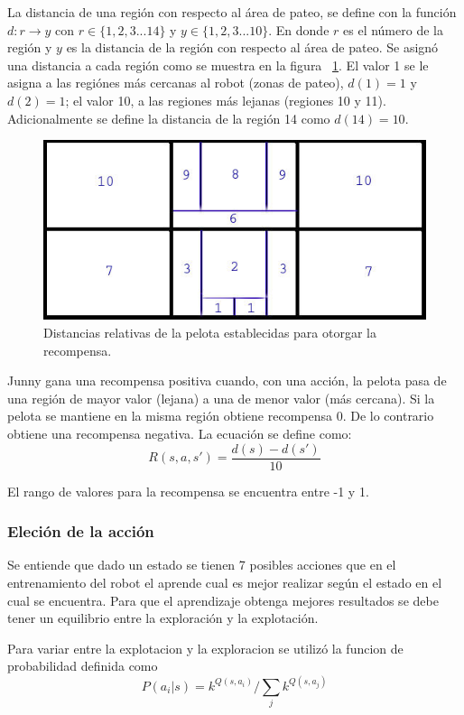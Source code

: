 La distancia de una región con respecto al área de pateo, se define con la función $d: r \rightarrow y$ con $r \in \{1,2,3 ...14\}$ y $y \in \{1,2,3 ...10\}$. En donde $r$ es el número de la región y $y$ es la distancia de la región con respecto al \'area de pateo. Se asign\'o una distancia a cada regi\'on como se muestra en la figura ~\ref{fig:distancias}. El valor 1 se le asigna a las regi\'ones m\'as cercanas al robot (zonas de pateo), $d(1)= 1$ y $d(2)=1$; el valor 10, a las regiones m\'as lejanas (regiones 10 y 11). Adicionalmente se define la distancia de la región 14 como $d(14)=10$. 
     
\begin{figure}[hbtp]
\centering
\includegraphics[scale=0.5]{imagenes/Distancias.jpg}
\caption{Distancias relativas de la pelota establecidas para otorgar la recompensa.}
\label{fig:distancias}
\end{figure}

Junny gana una recompensa positiva cuando, con una acción, la pelota pasa de una región de mayor valor (lejana) a una de menor valor (más cercana). Si la pelota se mantiene en la misma región obtiene recompensa 0. De lo contrario obtiene una recompensa negativa. La ecuación se define como:
\[R(s,a,s') = \dfrac{d(s)-d(s')}{10} \]

El rango de valores para la recompensa se encuentra entre -1 y 1. 


\subsubsection{Eleci\'on de la acci\'on}


Se entiende que dado un estado se tienen 7 posibles acciones que en el entrenamiento del robot el aprende cual es mejor realizar según el estado en el cual se encuentra. Para que el aprendizaje obtenga mejores resultados se debe tener un equilibrio entre la exploración y la explotación. 

Para variar entre la explotacion y la exploracion se utiliz\'o la funcion de probabilidad definida como  \[P(a_{i} | s) = k^{Q(s,a_{i})}/ \sum_{j}k^{Q(s,a_{j})}  \] 
 
 
 
 
 